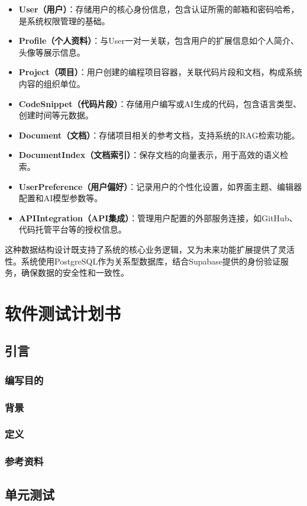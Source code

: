 \documentclass[
    report,     %
    oneside,    %
    UTF8,       %
    zihao=-4    %
]{config} %
\begin{document}
\begin{itemize}
    \item \textbf{User（用户）}：存储用户的核心身份信息，包含认证所需的邮箱和密码哈希，是系统权限管理的基础。
    \item \textbf{Profile（个人资料）}：与User一对一关联，包含用户的扩展信息如个人简介、头像等展示信息。
    \item \textbf{Project（项目）}：用户创建的编程项目容器，关联代码片段和文档，构成系统内容的组织单位。
    \item \textbf{CodeSnippet（代码片段）}：存储用户编写或AI生成的代码，包含语言类型、创建时间等元数据。
    \item \textbf{Document（文档）}：存储项目相关的参考文档，支持系统的RAG检索功能。
    \item \textbf{DocumentIndex（文档索引）}：保存文档的向量表示，用于高效的语义检索。
    \item \textbf{UserPreference（用户偏好）}：记录用户的个性化设置，如界面主题、编辑器配置和AI模型参数等。
    \item \textbf{APIIntegration（API集成）}：管理用户配置的外部服务连接，如GitHub、代码托管平台等的授权信息。
\end{itemize}

这种数据结构设计既支持了系统的核心业务逻辑，又为未来功能扩展提供了灵活性。系统使用PostgreSQL作为关系型数据库，结合Supabase提供的身份验证服务，确保数据的安全性和一致性。
\chapter{软件测试计划书}
\section{引言}
\subsection{编写目的}
\subsection{背景}
\subsection{定义}
\subsection{参考资料}
\section{单元测试}
\end{document}
